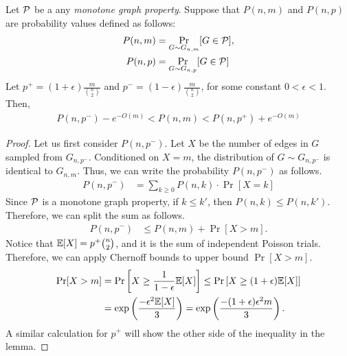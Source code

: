 \begin{lemma}
  Let ${\cal P}$ be a any \emph{monotone graph property}. 
  Suppose that $P(n,m)$ and $P(n,p)$ are probability values defined as follows:
  \begin{align*}
    P(n,m) &= \Pr_{G\sim G_{n,m}}[G \in {\cal P}], \\
    P(n,p) &= \Pr_{G \sim G_{n,p}}[G \in {\cal P}]
  \end{align*}
  Let $p^{+} = (1+\epsilon)\frac{m}{\binom{n}{2}}$ and
  $p^- = (1-\epsilon)\frac{m}{\binom{n}{2}}$, for some constant $0 < \epsilon < 1$. Then,
  \begin{align*}
    P(n,p^-) - e^{-O(m)} < P(n,m) < P(n,p^+) + e^{-O(m)}
  \end{align*}
  \label{lem:random-graph-equiv}
\end{lemma}
\begin{proof}
  Let us first consider $P(n,p^-)$. Let $X$ be the number of edges in $G$
  sampled from $G_{n,p^-}$. Conditioned on $X=m$, the distribution of
  $G\sim G_{n,p^-}$ is identical to $G_{n,m}$. Thus, we can write the
  probability $P(n,p^-)$ as follows.
  \begin{align*}
    P(n,p^-) &= \sum_{k\geq 0} P(n,k)\cdot \Pr[X=k]
  \end{align*}
  Since ${\cal P}$ is a monotone graph property, if $k \leq k'$, then
  $P(n,k) \leq P(n,k')$. Therefore, we can split the sum as follows.
  \begin{align*}
    P(n,p^-) &\leq P(n,m) + \Pr[X > m].
  \end{align*}
  Notice that $\mathbb{E}[X] = p^+ \binom{n}{2}$, and it is the sum of independent
  Poisson trials. Therefore, we can apply Chernoff bounds to upper bound
  $\Pr[X>m]$.
  \begin{align*}
    \Pr[X > m] &= \Pr\left[ X \geq \frac{1}{1-\epsilon}\mathbb{E}[X]  \right] \leq
                 \Pr\left[ X \geq (1+\epsilon)\mathbb{E}[X] \right]\\
               &= \exp\left( \frac{-\epsilon^2\mathbb{E}[X]}{3} \right) =
                 \exp\left( \frac{-(1+\epsilon)\epsilon^2 m}{3}  \right).
  \end{align*}
  A similar calculation for $p^+$ will show the other side of the inequality in
  the lemma.
\end{proof}

